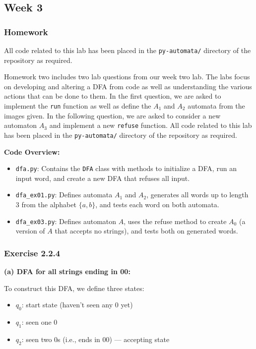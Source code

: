 \documentclass{article}
\theoremstyle{theorem}
\theoremstyle{definition}
\theoremstyle{remark}
\begin{document}
\subsection{Week 3}
\smallskip


\subsubsection*{Homework}

All code related to this lab has been placed in the \texttt{py-automata/} directory of the repository as required.

Homework two includes two lab questions from our week two lab. The labs focus on developing and altering a DFA from code as well as understanding the various actions that can be done to them. 
In the first question, we are asked to implement the \texttt{run} function as well as define the $A_1$ and $A_2$ automata from the images given. In the following question, we are asked to consider a new automaton $A_3$ and implement a new \texttt{refuse} function. 
All code related to this lab has been placed in the \texttt{py-automata/} directory of the repository as required.

\smallskip

\textbf{Code Overview:}
\begin{itemize}
    \item \texttt{dfa.py}: Contains the \texttt{DFA} class with methods to initialize a DFA, run an input word, and create a new DFA that refuses all input.
    \item \texttt{dfa\_ex01.py}: Defines automata $A_1$ and $A_2$, generates all words up to length 3 from the alphabet $\{a, b\}$, and tests each word on both automata.
    \item \texttt{dfa\_ex03.py}: Defines automaton $A$, uses the refuse method to create $A_0$ (a version of $A$ that accepts no strings), and tests both on generated words.
\end{itemize}

\subsubsection*{Exercise 2.2.4}

\textbf{(a) DFA for all strings ending in 00:}

To construct this DFA, we define three states:
\begin{itemize}
    \item $q_0$: start state (haven't seen any 0 yet)
    \item $q_1$: seen one 0
    \item $q_2$: seen two 0s (i.e., ends in 00) — accepting state
\end{itemize}
\end{document}
